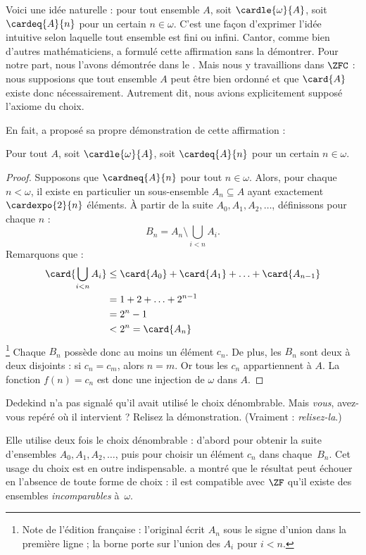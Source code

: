 \documentclass[../../../include/open-logic-section]{subfiles}
\begin{document}
\begin{ex}
Voici une idée naturelle : pour tout ensemble
$A$, soit $\cardle{\omega}{A}$, soit
$\cardeq{A}{n}$ pour un certain
$n \in \omega$. C'est une façon
d'exprimer l'idée intuitive selon laquelle
tout ensemble est fini ou infini.
Cantor, comme bien d'autres mathématiciens,
a formulé cette affirmation sans la démontrer.
Pour notre part, nous l'avons démontrée
dans le
.
Mais nous y travaillions dans $\ZFC$ :
nous supposions que tout ensemble $A$
peut être bien ordonné et que
$\card{A}$ existe donc nécessairement.
Autrement dit, nous avions explicitement
supposé l'axiome du choix.

En fait, \citet{Dedekind1888} a proposé
sa propre démonstration de cette affirmation :

\begin{thm}
Pour tout $A$, soit
$\cardle{\omega}{A}$, soit
$\cardeq{A}{n}$ pour un certain
$n \in \omega$.
\end{thm}

\begin{proof}
Supposons que $\cardneq{A}{n}$ pour
tout $n \in \omega$. Alors, pour chaque
$n < \omega$, il existe en particulier
un sous-ensemble $A_n \subseteq A$
ayant exactement $\cardexpo{2}{n}$
éléments. À partir de la suite
$A_0, A_1, A_2, \ldots$, définissons
pour chaque $n$ :
\[
	B_n = A_n \setminus
	\bigcup_{i < n} A_i.
\]
Remarquons que :
\begin{align*}
	\card{\bigcup_{i < n}A_i}
	&\leq \card{A_0} + \card{A_1}
	+ \ldots + \card{A_{n-1}}\\
	&=1 + 2 + \ldots + 2^{n-1}\\
	& = 2^n - 1\\
	& < 2^n = \card{A_n}
\end{align*}
\footnote{Note de l'édition française :
l'original écrit $A_n$ sous le signe
d'union dans la première ligne ;
la borne porte sur l'union des $A_i$
pour $i<n$.}
Chaque $B_n$ possède donc au moins
un élément $c_n$. De plus, les $B_n$
sont deux à deux disjoints : si
$c_n=c_m$, alors $n=m$.
Or tous les $c_n$ appartiennent à $A$.
La fonction $f(n)=c_n$ est donc une
injection de $\omega$ dans $A$.
\end{proof}
\noindent
Dedekind n'a pas signalé qu'il avait
utilisé le choix dénombrable.
Mais \emph{vous}, avez-vous repéré
où il intervient ? Relisez la
démonstration. (Vraiment :
\emph{relisez-la}.)

Elle utilise deux fois le choix
dénombrable : d'abord pour obtenir
la suite d'ensembles
$A_0, A_1, A_2, \ldots$,
puis pour choisir un élément $c_n$
dans chaque~$B_n$. Cet usage du choix
est en outre indispensable.
\citet[p.~138]{Cohen1966} a montré
que le résultat peut échouer en l'absence
de toute forme de choix : il est
compatible avec $\ZF$ qu'il existe
des ensembles \emph{incomparables}
à~$\omega$.
\end{ex}
\end{document}
